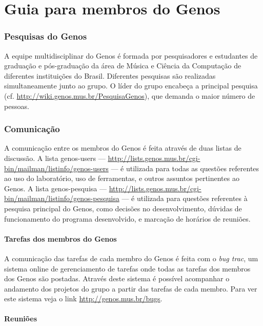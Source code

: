 \documentclass[12pt,brazil]{book}
\begin{document}
\part{Guia para membros do Genos}
\label{part:guia-para-membros}

\section{Pesquisas do Genos}
\label{sec:pesquisas-do-genos}

A equipe multidisciplinar do Genos é formada por pesquisadores e
estudantes de graduação e pós-graduação da área de Música e Ciência da
Computação de diferentes instituições do Brasil. Diferentes pesquisas
são realizadas simultaneamente junto ao grupo. O líder do grupo
encabeça a principal pesquisa
(cf. \url{http://wiki.genos.mus.br/PesquisaGenos}), que demanda o
maior número de pessoas.

\section{Comunicação}
\label{sec:comunicacao}

A comunicação entre os membros do Genos é feita através de duas listas
de discussão. A lista genos-users ---
\url{http://lists.genos.mus.br/cgi-bin/mailman/listinfo/genos-users}
--- é utilizada para todas as questões referentes ao uso do
laboratório, uso de ferramentas, e outros assuntos pertinentes ao
Genos. A lista genos-pesquisa ---
\url{http://lists.genos.mus.br/cgi-bin/mailman/listinfo/genos-pesquisa}
--- é utilizada para questões referentes à pesquisa principal do
Genos, como decisões no desenvolvimento, dúvidas de funcionamento do
programa desenvolvido, e marcação de horários de reuniões.

\subsection{Tarefas dos membros do Genos}
\label{sec:tarefas-dos-membros}

A comunicação das tarefas de cada membro do Genos é feita com o
\textit{bug trac}, um sistema online de gerenciamento de tarefas onde
todas as tarefas dos membros dos Genos são postadas. Através deste
sistema é possível acompanhar o andamento dos projetos do grupo a
partir das tarefas de cada membro. Para ver este sistema veja o link
\url{http://genos.mus.br/bugs}.

\subsection{Reuniões}
\label{sec:reunioes}
\end{document}
